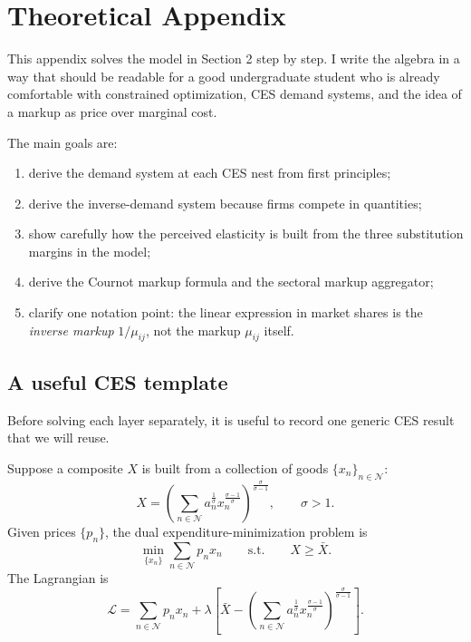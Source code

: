 
\section{Theoretical Appendix}
\label{app:theory}

This appendix solves the model in Section 2 step by step. I write the algebra in a way that should be readable for a good undergraduate student who is already comfortable with constrained optimization, CES demand systems, and the idea of a markup as price over marginal cost.

The main goals are:
\begin{enumerate}
    \item derive the demand system at each CES nest from first principles;
    \item derive the inverse-demand system because firms compete in quantities;
    \item show carefully how the perceived elasticity is built from the three substitution margins in the model;
    \item derive the Cournot markup formula and the sectoral markup aggregator;
    \item clarify one notation point: the linear expression in market shares is the \emph{inverse markup} $1/\mu_{ij}$, not the markup $\mu_{ij}$ itself.
\end{enumerate}

\subsection{A useful CES template}

Before solving each layer separately, it is useful to record one generic CES result that we will reuse.

Suppose a composite $X$ is built from a collection of goods $\{x_n\}_{n \in \mathcal{N}}$:
\[
X =
\left(
\sum_{n \in \mathcal{N}}
a_n^{\frac{1}{\sigma}} x_n^{\frac{\sigma-1}{\sigma}}
\right)^{\frac{\sigma}{\sigma-1}},
\qquad \sigma > 1.
\]
Given prices $\{p_n\}$, the dual expenditure-minimization problem is
\[
\min_{\{x_n\}} \sum_{n \in \mathcal{N}} p_n x_n
\qquad \text{s.t.} \qquad
X \geq \bar{X}.
\]
The Lagrangian is
\[
\mathcal{L}
=
\sum_{n \in \mathcal{N}} p_n x_n
+
\lambda
\left[
\bar{X}
-
\left(
\sum_{n \in \mathcal{N}}
a_n^{\frac{1}{\sigma}} x_n^{\frac{\sigma-1}{\sigma}}
\right)^{\frac{\sigma}{\sigma-1}}
\right].
\]

